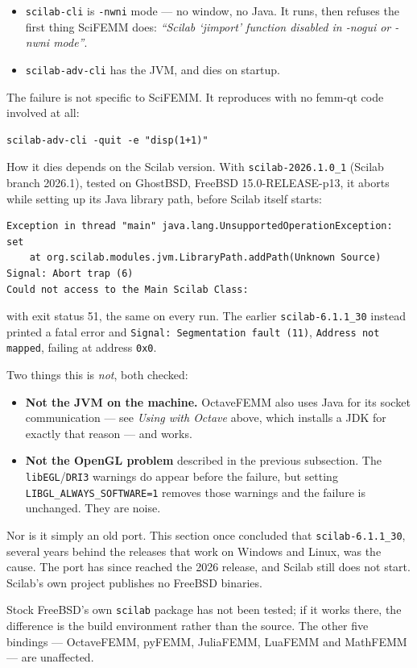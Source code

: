 \documentclass[11pt]{article}
\begin{document}
\begin{itemize}[nosep]
\item \texttt{scilab-cli} is \texttt{-nwni} mode --- no window, no Java.  It
      runs, then refuses the first thing SciFEMM does: \emph{``Scilab
      `jimport' function disabled in -nogui or -nwni mode''}.
\item \texttt{scilab-adv-cli} has the JVM, and dies on startup.
\end{itemize}

The failure is not specific to SciFEMM.  It reproduces with no femm-qt code
involved at all:
\begin{lstlisting}
scilab-adv-cli -quit -e "disp(1+1)"
\end{lstlisting}

How it dies depends on the Scilab version.  With \texttt{scilab-2026.1.0\_1}
(Scilab branch 2026.1), tested on GhostBSD, FreeBSD 15.0-RELEASE-p13, it
aborts while setting up its Java library path, before Scilab itself starts:
\begin{lstlisting}
Exception in thread "main" java.lang.UnsupportedOperationException: set
    at org.scilab.modules.jvm.LibraryPath.addPath(Unknown Source)
Signal: Abort trap (6)
Could not access to the Main Scilab Class:
\end{lstlisting}
with exit status 51, the same on every run.  The earlier
\texttt{scilab-6.1.1\_30} instead printed a fatal error and
\texttt{Signal: Segmentation fault (11)}, \texttt{Address not mapped}, failing
at address \texttt{0x0}.

Two things this is \emph{not}, both checked:

\begin{itemize}[nosep]
\item \textbf{Not the JVM on the machine.}  OctaveFEMM also uses Java for its
      socket communication --- see \emph{Using with Octave} above, which
      installs a JDK for exactly that reason --- and works.
\item \textbf{Not the OpenGL problem} described in the previous subsection.
      The \texttt{libEGL}/\texttt{DRI3} warnings do appear before the
      failure, but setting \texttt{LIBGL\_ALWAYS\_SOFTWARE=1} removes those
      warnings and the failure is unchanged.  They are noise.
\end{itemize}

Nor is it simply an old port.  This section once concluded that
\texttt{scilab-6.1.1\_30}, several years behind the releases that work on
Windows and Linux, was the cause.  The port has since reached the 2026
release, and Scilab still does not start.  Scilab's own project publishes no
FreeBSD binaries.

Stock FreeBSD's own \texttt{scilab} package has not been tested; if it works
there, the difference is the build environment rather than the source.  The
other five bindings --- OctaveFEMM, pyFEMM, JuliaFEMM, LuaFEMM and MathFEMM
--- are unaffected.
\end{document}
